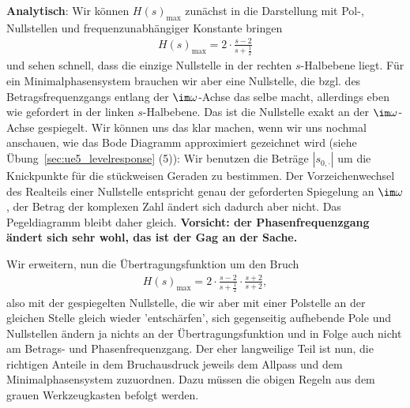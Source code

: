 \begin{ExCalc}
\textbf{Analytisch}:
Wir können $H(s)_\mathrm{max} $ zunächst in die Darstellung mit
Pol-, Nullstellen und frequenzunabhängiger Konstante bringen
\begin{align}
H(s)_\mathrm{max} = 2\cdot\frac{s-2}{s+\frac{1}{2}}
\end{align}
und sehen schnell, dass die einzige Nullstelle in der rechten $s$-Halbebene liegt.
Für ein Minimalphasensystem brauchen wir aber eine Nullstelle, die bzgl. des
Betragsfrequenzgangs entlang der $\im\omega$-Achse das selbe macht, allerdings
eben wie gefordert in der linken $s$-Halbebene.
Das ist die Nullstelle exakt an der $\im\omega$-Achse gespiegelt.
Wir können uns das klar machen, wenn wir uns nochmal anschauen, wie das Bode
Diagramm approximiert gezeichnet wird (siehe Übung~\ref{sec:ue5_levelresponse} (5)):
Wir benutzen die Beträge $|s_{0,\cdot}|$ um die Knickpunkte für
die stückweisen Geraden zu bestimmen.
Der Vorzeichenwechsel des Realteils einer Nullstelle entspricht genau der
geforderten Spiegelung an $\im\omega$, der Betrag der komplexen Zahl ändert
sich dadurch aber nicht. Das Pegeldiagramm bleibt daher gleich. \textbf{Vorsicht: der
Phasenfrequenzgang ändert sich sehr wohl, das ist der Gag an der Sache.}

Wir erweitern,
nun die Übertragungsfunktion um den Bruch
\begin{align}
H(s)_\mathrm{max} = 2\cdot\frac{s-2}{s+\frac{1}{2}} \cdot \frac{s+2}{s+2},
\end{align}
also mit der gespiegelten Nullstelle, die wir aber mit einer Polstelle
an der gleichen Stelle gleich wieder 'entschärfen', sich gegenseitig aufhebende Pole und Nullstellen
ändern ja nichts an der Übertragungsfunktion und in Folge auch nicht am Betrags-
und Phasenfrequenzgang.
Der eher langweilige Teil ist nun, die richtigen Anteile in dem Bruchausdruck
jeweils dem Allpass und dem Minimalphasensystem zuzuordnen.
Dazu müssen die obigen Regeln aus dem grauen Werkzeugkasten befolgt werden.


\end{ExCalc}
